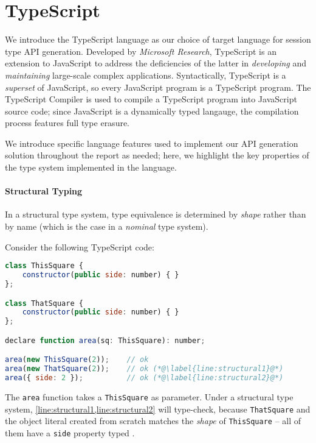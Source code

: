 \section{TypeScript}
\label{section:typescript}

We introduce the TypeScript language 
\cite{UnderstandingTypeScript}
as our choice of target language
for session type API generation.
Developed by \textit{Microsoft Research},
TypeScript is an extension to
JavaScript to address
the deficiencies of the latter in
\textit{developing} and \textit{maintaining}
large-scale complex applications.
Syntactically,
TypeScript is a \textit{superset} of JavaScript,
so every JavaScript program is a
TypeScript program.
The TypeScript Compiler is used
to compile a TypeScript program into JavaScript
source code; since
JavaScript is a dynamically typed langauge,
the compilation process features full type erasure.

We introduce specific language
features used to implement our API generation
solution throughout the report as needed;
here, we highlight the key properties
of the type system implemented in the language.

\paragraph{Structural Typing}
In a structural type system, type equivalence
is determined by \textit{shape} rather than by name
(which is the case in a \textit{nominal} type system).

Consider the following TypeScript code:

\begin{lstlisting}[language=javascript]
class ThisSquare {
	constructor(public side: number) { }
};

class ThatSquare {
	constructor(public side: number) { }
};

declare function area(sq: ThisSquare): number;

area(new ThisSquare(2));	// ok
area(new ThatSquare(2));	// ok (*@\label{line:structural1}@*)
area({ side: 2 });			// ok (*@\label{line:structural2}@*)
\end{lstlisting}

The \texttt{area} function takes a \texttt{ThisSquare}
as parameter.
Under a structural type system,
\cref{line:structural1,line:structural2}
will type-check, because \texttt{ThatSquare} and the object
literal created from scratch matches the \textit{shape}
of \texttt{ThisSquare} -- all of them have a \texttt{side}
property typed .

